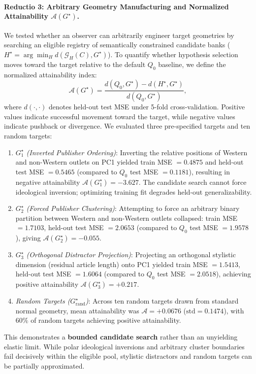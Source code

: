 \paragraph{Reductio 3: Arbitrary Geometry Manufacturing and Normalized Attainability $\mathcal{A}(G^\star)$.}
We tested whether an observer can arbitrarily engineer target geometries by searching an eligible registry of semantically constrained candidate banks ($H^\star = \arg\min_H d(\mathcal{G}_H(C), G^\star)$). To quantify whether hypothesis selection moves toward the target relative to the default $Q_0$ baseline, we define the normalized attainability index:
\begin{equation}
    \mathcal{A}(G^\star) = \frac{d(Q_0, G^\star) - d(H^\star, G^\star)}{d(Q_0, G^\star)},
\end{equation}
where $d(\cdot, \cdot)$ denotes held-out test MSE under 5-fold cross-validation. Positive values indicate successful movement toward the target, while negative values indicate pushback or divergence. We evaluated three pre-specified targets and ten random targets:
\begin{enumerate}
    \item \emph{$G^\star_1$ (Inverted Publisher Ordering)}: Inverting the relative positions of Western and non-Western outlets on PC1 yielded train MSE $= 0.4875$ and held-out test MSE $= 0.5465$ (compared to $Q_0$ test MSE $= 0.1181$), resulting in negative attainability $\mathcal{A}(G^\star_1) = \mathbf{-3.627}$. The candidate search cannot force ideological inversion; optimizing training fit degrades held-out generalizability.
    \item \emph{$G^\star_2$ (Forced Publisher Clustering)}: Attempting to force an arbitrary binary partition between Western and non-Western outlets collapsed: train MSE $= 1.7103$, held-out test MSE $= 2.0653$ (compared to $Q_0$ test MSE $= 1.9578$), giving $\mathcal{A}(G^\star_2) = \mathbf{-0.055}$.
    \item \emph{$G^\star_3$ (Orthogonal Distractor Projection)}: Projecting an orthogonal stylistic dimension (residual article length) onto PC1 yielded train MSE $= 1.5413$, held-out test MSE $= 1.6064$ (compared to $Q_0$ test MSE $= 2.0518$), achieving positive attainability $\mathcal{A}(G^\star_3) = \mathbf{+0.217}$.
    \item \emph{Random Targets ($G^\star_{\mathrm{rand}}$)}: Across ten random targets drawn from standard normal geometry, mean attainability was $\mathcal{A} = \mathbf{+0.0676}$ ($\mathrm{std} = 0.1474$), with $60\%$ of random targets achieving positive attainability.
\end{enumerate}
This demonstrates a \textbf{bounded candidate search} rather than an unyielding elastic limit. While polar ideological inversions and arbitrary cluster boundaries fail decisively within the eligible pool, stylistic distractors and random targets can be partially approximated.

